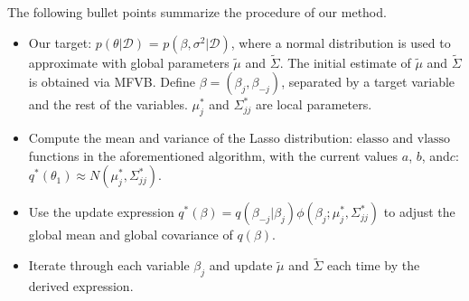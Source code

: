 \noindent The following bullet points summarize the procedure of our method.
\begin{itemize}
	\item Our target: $p(\theta|\mathcal{D})$ = $p(\beta, \sigma^2|\mathcal{D})$, where a normal distribution is used to approximate with global parameters $\tilde{\mu}$ and $\tilde{\Sigma}$. The initial estimate of $\tilde{\mu}$ and $\tilde{\Sigma}$ is obtained via MFVB. Define $\beta = (\beta_j,\beta_{-j})$, separated by a target variable and the rest of the variables. $\mu_{j}^*$ and $\Sigma_{jj}^*$ are local parameters.
	
	
	\item Compute the mean and variance of the Lasso distribution: $\text{elasso}$ and $\text{vlasso}$ functions in the aforementioned algorithm, with the current values $a$, $b$, and$c$: $q^*(\theta_1) \approx N(\mu_j^*,\Sigma_{jj}^*)$.
	\item Use the update expression $q^*(\beta) = q(\beta_{-j}|\beta_j)\phi(\beta_j;\mu_j^*,\Sigma_{jj}^*)$ to adjust the global mean and global covariance of $q(\beta)$.
	\item Iterate through each variable $\beta_j$ and update $\tilde{\mu}$ and $\tilde{\Sigma}$ each time by the derived expression.
\end{itemize}

\newpage
